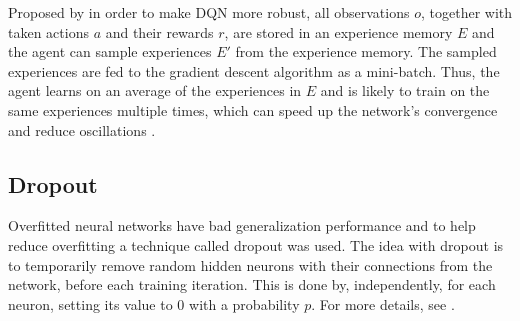 Proposed by \cite{MnihPlayingLearning} in order to make DQN more robust, all observations $o$, together with taken actions $a$ and their rewards $r$, are stored in an experience memory $E$ and the agent can sample experiences $E'$ from the experience memory. The sampled experiences are fed to the gradient descent algorithm as a mini-batch. Thus, the agent learns on an average of the experiences in $E$ and is likely to train on the same experiences multiple times, which can speed up the network's convergence and reduce oscillations \cite{Lin1992Self-ImprovingTeaching}.

\subsection{Dropout}
Overfitted neural networks have bad generalization performance \cite{Hinton2012ImprovingDetectors} and to help reduce overfitting a technique called dropout was used. The idea with dropout is to temporarily remove random hidden neurons with their connections from the network, before each training iteration. This is done by, independently, for each neuron, setting its value to 0 with a probability $p$. For more details, see \cite{Srivastava2014Dropout:Overfitting}. 


